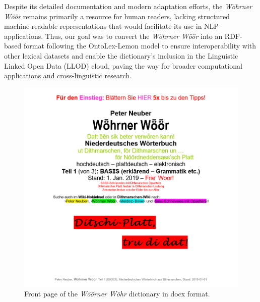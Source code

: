 \documentclass{article}
\begin{document}
Despite its detailed documentation and modern adaptation efforts, the \emph{Wöhrner Wöör} remains primarily a resource for human readers, lacking structured machine-readable representations that would facilitate its use in NLP applications. Thus, our goal was to convert the \emph{Wöhrner Wöör} into an RDF-based format following the OntoLex-Lemon model to ensure interoperability with other lexical datasets and enable the dictionary’s inclusion in the Linguistic Linked Open Data (LLOD) cloud, paving the way for broader computational applications and cross-linguistic research.

\begin{figure}
    \centering
    \includegraphics[width=1\linewidth]{woewoe_cover.png}
    \caption{Front page of the \emph{Wöörner Wöhr} dictionary in docx format.}
    \label{fig:enter-label}
\end{figure}
\end{document}
